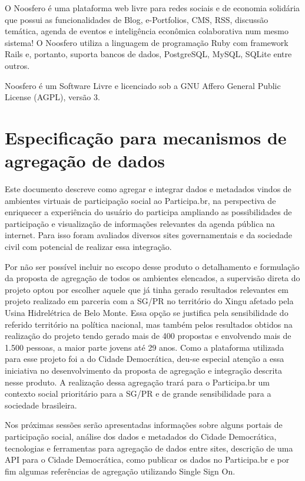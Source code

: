 \documentclass[12pt]{article}
\begin{document}
O Noosfero\cite{noosfero} é uma plataforma web livre para redes sociais e de
economia solidária que possui as funcionalidades de Blog, e-Portfolios, CMS,
RSS, discussão temática, agenda de eventos e inteligência econômica
colaborativa num mesmo sistema! O Noosfero utiliza a linguagem de programação
Ruby com framework Rails e, portanto, suporta bancos de dados, PostgreSQL,
MySQL, SQLite entre outros.

Noosfero é um Software Livre e licenciado sob a GNU Affero General Public
License (AGPL), versão 3.

\section{Especificação para mecanismos de agregação de dados}

Este documento descreve como agregar e integrar dados e metadados vindos de
ambientes virtuais de participação social ao Participa.br, na perspectiva de
enriquecer a experiência do usuário do participa ampliando as possibilidades
de participação e visualização de informações relevantes da agenda pública na
internet. Para isso foram avaliados diversos sites governamentais e da
sociedade civil com potencial de realizar essa integração.

Por não ser possível incluir no escopo desse produto o detalhamento e
formulação da proposta de agregação de todos os ambientes elencados, a
supervisão direta do projeto optou por escolher aquele que já tinha gerado
resultados relevantes em projeto realizado em parceria com a SG/PR no
território do Xingu afetado pela Usina Hidrelétrica de Belo Monte. Essa opção
se justifica pela sensibilidade do referido território na política nacional,
mas também pelos resultados obtidos na realização do projeto tendo gerado mais
de 400 propostas e envolvendo mais de 1.500 pessoas, a maior parte jovens até
29 anos. Como a plataforma utilizada para esse projeto foi a do Cidade
Democrática, deu-se especial atenção a essa iniciativa no desenvolvimento da
proposta de agregação e integração descrita nesse produto. A realização dessa
agregação trará para o Participa.br um contexto social prioritário para a
SG/PR e de grande sensibilidade para a sociedade brasileira.

Nos próximas sessões serão apresentadas informações sobre alguns portais de
participação social, análise dos dados e metadados do Cidade Democrática,
tecnologias e ferramentas para agregação de dados entre sites, descrição de
uma API para o Cidade Democrática, como publicar os dados no Participa.br e
por fim algumas referências de agregação utilizando Single Sign On.
\end{document}
